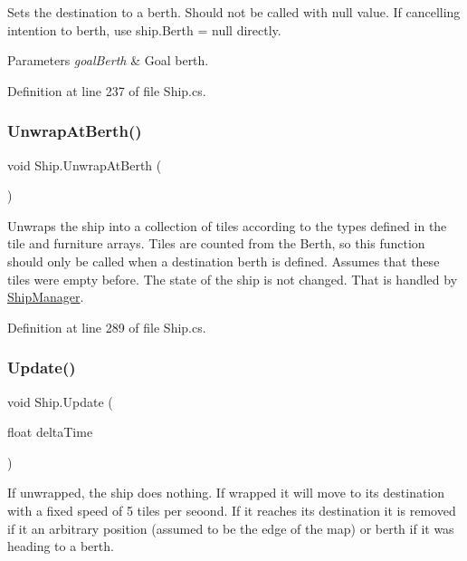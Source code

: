 Sets the destination to a berth. Should not be called with null value. If cancelling intention to berth, use {\ttfamily ship.\+Berth = null} directly. 


\begin{DoxyParams}{Parameters}
{\em goal\+Berth} & Goal berth.\\
\hline
\end{DoxyParams}


Definition at line 237 of file Ship.\+cs.

\mbox{\label{class_ship_a56485e286ef7dcb757681217bcc796f5}} 
\subsubsection{\texorpdfstring{Unwrap\+At\+Berth()}{UnwrapAtBerth()}}
{\footnotesize\ttfamily void Ship.\+Unwrap\+At\+Berth (\begin{DoxyParamCaption}{ }\end{DoxyParamCaption})}



Unwraps the ship into a collection of tiles according to the types defined in the tile and furniture arrays. Tiles are counted from the Berth, so this function should only be called when a destination berth is defined. Assumes that these tiles were empty before. The state of the ship is not changed. That is handled by \hyperlink{class_ship_manager}{Ship\+Manager}. 



Definition at line 289 of file Ship.\+cs.

\mbox{\label{class_ship_a6fd507fb621f00ba01a76fa685cc0d66}} 
\subsubsection{\texorpdfstring{Update()}{Update()}}
{\footnotesize\ttfamily void Ship.\+Update (\begin{DoxyParamCaption}\item[{float}]{delta\+Time }\end{DoxyParamCaption})}



If unwrapped, the ship does nothing. If wrapped it will move to its destination with a fixed speed of 5 tiles per seoond. If it reaches its destination it is removed if it an arbitrary position (assumed to be the edge of the map) or berth if it was heading to a berth. 


